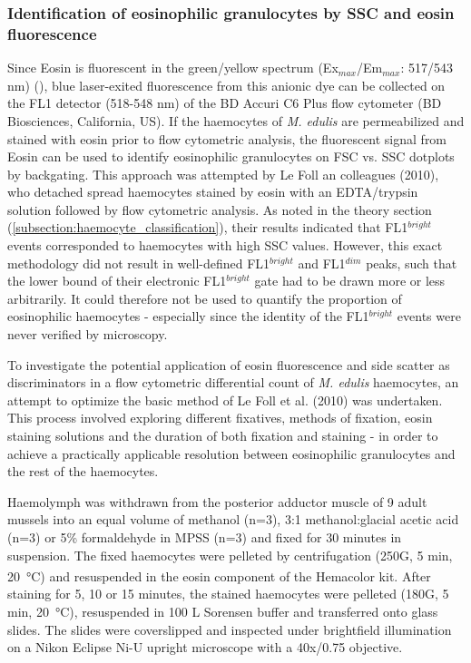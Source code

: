 \subsubsection{Identification of eosinophilic granulocytes by SSC and eosin fluorescence}
Since Eosin is fluorescent in the green/yellow spectrum (Ex$_{max}$/Em$_{max}$: 517/543 nm) (\cite{Koegle2020}), blue laser-exited fluorescence from this anionic dye can be collected on the FL1 detector (518-548 nm) of the BD Accuri C6 Plus flow cytometer (BD Biosciences, California, US). If the haemocytes of \emph{M. edulis} are permeabilized and stained with eosin prior to flow cytometric analysis, the fluorescent signal from Eosin can be used to identify eosinophilic granulocytes on FSC vs. SSC dotplots by backgating. This approach was attempted by Le Foll an colleagues (2010), who detached spread haemocytes stained by eosin with an EDTA/trypsin solution followed by flow cytometric analysis. As noted in the theory section (\ref{subsection:haemocyte_classification}), their results indicated that FL1$^{bright}$ events corresponded to haemocytes with high SSC values. However, this exact methodology did not result in well-defined FL1$^{bright}$ and FL1$^{dim}$ peaks, such that the lower bound of their electronic FL1$^{bright}$ gate had to be drawn more or less arbitrarily. It could therefore not be used to quantify the proportion of eosinophilic haemocytes - especially since the identity of the FL1$^{bright}$ events were never verified by microscopy.

To investigate the potential application of eosin fluorescence and side scatter as discriminators in a flow cytometric differential count of \emph{M. edulis} haemocytes, an attempt to optimize the basic method of Le Foll et al. (2010) was undertaken. This process involved exploring different fixatives, methods of fixation, eosin staining solutions and the duration of both fixation and staining - in order to achieve a practically applicable resolution between eosinophilic granulocytes and the rest of the haemocytes. 

Haemolymph was withdrawn from the posterior adductor muscle of 9 adult mussels into an equal volume of methanol (n=3), 3:1 methanol:glacial acetic acid (n=3) or 5\% formaldehyde in MPSS (n=3) and fixed for 30 minutes in suspension. The fixed haemocytes were pelleted by centrifugation (250G, 5 min, \SI{20}{\celsius}) and resuspended in the eosin component of the Hemacolor\textsuperscript{\textregistered} kit. After staining for 5, 10 or 15 minutes, the stained haemocytes were pelleted (180G, 5 min, \SI{20}{\celsius}), resuspended in 100 \micro L Sorensen buffer and transferred onto glass slides. The slides were coverslipped and inspected under brightfield illumination on a Nikon Eclipse Ni-U upright microscope with a 40x/0.75 objective.

